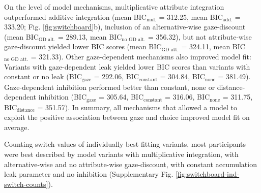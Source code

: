 \documentclass[11pt, a4paper]{article}
\begin{document}
On the level of model mechanisms, multiplicative attribute integration outperformed additive integration (mean BIC$_{\text{mul.}}$ = 312.25, mean BIC$_{\text{add.}}$ = 333.20; Fig. \ref{fig:switchboard}b), inclusion of an alternative-wise gaze-discount (mean BIC$_{\text{GD alt.}}$ = 289.13, mean BIC$_{\text{no GD alt.}}$  = 356.32), but not attribute-wise gaze-discount yielded lower BIC scores (mean BIC$_{\text{GD att.}}$  = 324.11, mean BIC$_{\text{no GD att.}}$ = 321.33). Other gaze-dependent mechanisms also improved model fit: Variants with gaze-dependent leak yielded lower BIC scores than variants with constant or no leak (BIC$_{\text{gaze}}$  = 292.06, BIC$_{\text{constant}}$ = 304.84, BIC$_{\text{none}}$ = 381.49). Gaze-dependent inhibition performed better than constant, none or distance-dependent inhibition (BIC$_{\text{gaze}}$ = 305.64, BIC$_{\text{constant}}$ = 316.06, BIC$_{\text{none}}$ = 311.75, BIC$_{\text{distance}}$ = 351.57). In summary, all mechanisms that allowed a model to exploit the positive association between gaze and choice improved model fit on average.

Counting switch-values of individually best fitting variants, most participants were best described by model variants with multiplicative integration, with alternative-wise and no attribute-wise gaze-discount, with constant accumulation leak parameter and no inhibition (Supplementary Fig. \ref{fig:switchboard-ind-switch-counts}).
\end{document}
